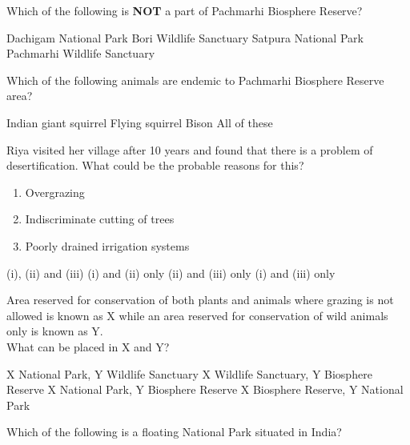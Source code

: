 \begin{questions}
\question Which of the following is \textbf{NOT} a part of Pachmarhi Biosphere Reserve?

    \begin{randomizeoneparchoices}
        \CorrectChoice Dachigam National Park
        \choice Bori Wildlife Sanctuary
        \choice Satpura National Park
        \choice Pachmarhi Wildlife Sanctuary
    \end{randomizeoneparchoices}

    \question Which of the following animals are endemic to Pachmarhi Biosphere Reserve area?

    \begin{choices}
        \choice Indian giant squirrel
        \choice Flying squirrel
        \choice Bison
        \CorrectChoice All of these
    \end{choices}

    \question Riya visited her village after 10 years and found that there is a problem of desertification. What could be the probable reasons for this?
    \begin{enumerate}[align=left,label=\roman*.]
        \item Overgrazing
        \item Indiscriminate cutting of trees
        \item Poorly drained irrigation systems
    \end{enumerate}
    \begin{randomizeoneparchoices}
        \CorrectChoice (i), (ii) and (iii)
        \choice (i) and (ii) only
        \choice (ii) and (iii) only
        \choice (i) and (iii) only
    \end{randomizeoneparchoices}

    \question Area reserved for conservation of both plants and animals where grazing is not allowed is known as X while an area reserved for conservation of wild animals only is known as Y. \\ What can be placed in X and Y?

    \begin{randomizechoices}
        \CorrectChoice X \textendash National Park, Y \textendash Wildlife Sanctuary
        \choice X \textendash Wildlife Sanctuary, Y \textendash Biosphere Reserve
        \choice X \textendash National Park, Y \textendash Biosphere Reserve
        \choice X \textendash Biosphere Reserve, Y \textendash National Park
    \end{randomizechoices}

    \question Which of the following is a floating National Park situated in India?


\end{questions}
